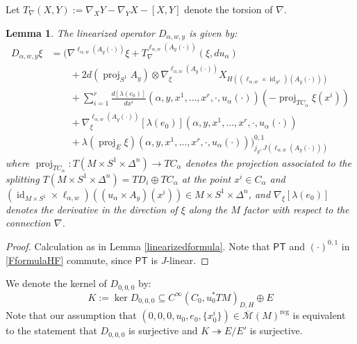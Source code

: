\documentclass[12pt]{article}
\newtheorem{lemma}[theorem]{Lemma}
\theoremstyle{definition}
\theoremstyle{remark}
\numberwithin{equation}{subsection}
\newcommand{\PT}{\mathsf{PT}}
\newcommand{\proj}{\operatorname{proj}}
\newcommand{\Mbar}{\overline{\mathcal M}}
\newcommand{\id}{\operatorname{id}}
\newcommand{\reg}{\mathrm{reg}}
\begin{document}
Let $T_\nabla(X,Y):=\nabla_XY-\nabla_YX-[X,Y]$ denote the torsion of $\nabla$.

\begin{lemma}\label{linearizedformulaHF}
The linearized operator $D_{\alpha,w,y}$ is given by:
\begin{align}\label{formulaforlinearizedoperatorHF}
D_{\alpha,w,y}\xi&=\biggl(\nabla^{\ell_{\alpha,w}(A_y(\cdot))}\xi+T_\nabla^{\ell_{\alpha,w}(A_y(\cdot))}(\xi,du_\alpha)\\
&\quad\quad+2d(\proj_{S^1}A_y)\otimes\nabla_\xi^{\ell_{\alpha,w}(A_y(\cdot))}X_{H((\ell_{\alpha,w}\times\id_{S^1})(A_y(\cdot)))}\\
\label{firstLterm}&\quad\quad+\sum_{i=1}^r\frac{d[\lambda(e_0)]}{dx^i}(\alpha,y,x^1,\ldots,x^r,\cdot,u_\alpha(\cdot))(-\proj_{TC_\alpha}\xi(x^i))\\
&\quad\quad+\nabla_\xi^{\ell_{\alpha,w}(A_y(\cdot))}[\lambda(e_0)](\alpha,y,x^1,\ldots,x^r,\cdot,u_\alpha(\cdot))\\
\label{lastLterm}&\quad\quad+\lambda(\proj_E\xi)(\alpha,y,x^1,\ldots,x^r,\cdot,u_\alpha(\cdot))\biggr)^{0,1}_{j_y,J(\ell_{\alpha,w}(A_y(\cdot)))}
\end{align}
where $\proj_{TC_\alpha}:T(M\times S^1\times\Delta^n)\to TC_\alpha$ denotes the projection associated to the splitting $T(M\times S^1\times\Delta^n)=TD_i\oplus TC_\alpha$ at the point $x^i\in C_\alpha$ and $(\id_{M\times S^1}\times\ell_{\alpha,w})((u_\alpha\times A_y)(x^i))\in M\times S^1\times\Delta^n$, and $\nabla_\xi[\lambda(e_0)]$ denotes the derivative in the direction of $\xi$ along the $M$ factor with respect to the connection $\nabla$.
\end{lemma}

\begin{proof}
Calculation as in Lemma \ref{linearizedformula}.  Note that $\PT$ and $(\cdot)^{0,1}$ in \eqref{FformulaHF} commute, since $\PT$ is $J$-linear.
\end{proof}

We denote the kernel of $D_{0,0,0}$ by:
\begin{equation}\label{definitionofkernel}
K:=\ker D_{0,0,0}\subseteq C^\infty(C_0,u_0^\ast TM)_{D,H}\oplus E
\end{equation}
Note that our assumption that $(0,0,0,u_0,e_0,\{x_0^i\})\in\Mbar(M)^\reg$ is equivalent to the statement that $D_{0,0,0}$ is surjective and $K\twoheadrightarrow E/E'$ is surjective.
\end{document}
